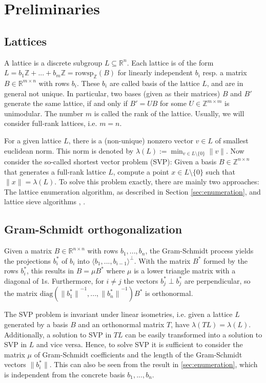 \documentclass{scrartcl}
\newcommand{\Z}{\mathbb{Z}}
\newcommand{\R}{\mathbb{R}}
\begin{document}
    \section{Preliminaries}

    \subsection{Lattices}

    A lattice is a discrete subgroup $L \subseteq \R^n$. Each lattice is of the form $L = b_1 \Z + ... + b_m \Z = \mathrm{rowsp}_{\Z}(B)$ for linearly independent $b_i$ resp. a matrix $B \in \R^{m \times n}$ with rows $b_i$. 
    These $b_i$ are called basis of the lattice $L$, and are in general not unique. 
    In particular, two bases (given as their matrices) $B$ and $B'$ generate the same lattice, if and only if $B' = UB$ for some $U \in \Z^{m \times m}$ is unimodular.
    The number $m$ is called the rank of the lattice. Usually, we will consider full-rank lattices, i.e. $m = n$.

    For a given lattice $L$, there is a (non-unique) nonzero vector $v \in L$ of smallest euclidean norm. This norm is denoted by $\lambda(L) := \min_{v \in L \setminus \{0\}} \| v \|$. 
    Now consider the so-called shortest vector problem (SVP): Given a basis $B \in \Z^{n \times n}$ that generates a full-rank lattice $L$, compute a point $x \in L \setminus \{0\}$ such that $\| x \| = \lambda(L)$. 
    To solve this problem exactly, there are mainly two approaches: The lattice enumeration algorithm, as described in Section \ref{sec:enumeration}, and lattice sieve algorithms \cite{sieve}, \cite{g6k}.

    \subsection{Gram-Schmidt orthogonalization}

    Given a matrix $B \in \R^{n \times n}$ with rows $b_1, ..., b_n$, the Gram-Schmidt process yields the projections $b^*_i$ of $b_i$ into $\langle b_1, ..., b_{i - 1} \rangle ^ \perp$. With the matrix $B^*$ formed by the rows $b^*_i$, this results in $B = \mu B^*$ where $\mu$ is a lower triangle matrix with a diagonal of $1$s. Furthermore, for $i \neq j$ the vectors $b^*_j \perp b^*_j$ are perpendicular, so the matrix $\mathrm{diag}( {\|b^*_1\|}^{-1}, ..., {\|b^*_n\|}^{-1} ) B^*$ is orthonormal.

    The SVP problem is invariant under linear isometries, i.e. given a lattice $L$ generated by a basis $B$ and an orthonormal matrix $T$, have $\lambda(TL) = \lambda(L)$. Additionally, a solution to SVP in $TL$ can be easily transformed into a solution to SVP in $L$ and vice versa.
    Hence, to solve SVP it is sufficient to consider the matrix $\mu$ of Gram-Schmidt coefficients and the length of the Gram-Schmidt vectors $\| b^*_i \|$. This can also be seen from the result in \ref{sec:enumeration}, which is independent from the concrete basis $b_1, ..., b_n$.
\end{document}
